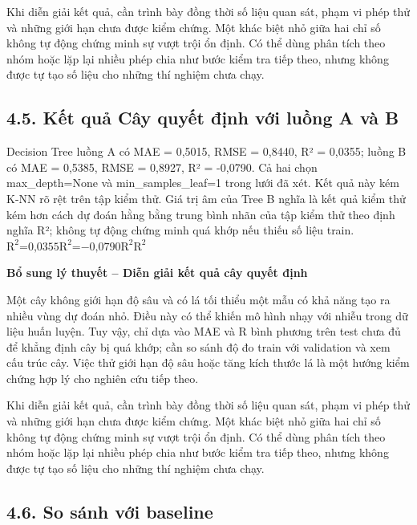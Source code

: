 \documentclass[12pt,a4paper,oneside]{article}
\begin{document}
Khi diễn giải kết quả, cần trình bày đồng thời số liệu quan sát, phạm vi phép thử và những giới hạn chưa được kiểm chứng. Một khác biệt nhỏ giữa hai chỉ số không tự động chứng minh sự vượt trội ổn định. Có thể dùng phân tích theo nhóm hoặc lặp lại nhiều phép chia như bước kiểm tra tiếp theo, nhưng không được tự tạo số liệu cho những thí nghiệm chưa chạy.\par

\subsection*{4.5. Kết quả Cây quyết định với luồng A và B}

Decision Tree luồng A có MAE = 0,5015, RMSE = 0,8440, R² = 0,0355; luồng
B có MAE = 0,5385, RMSE = 0,8927, R² = -0,0790. Cả hai chọn
max\_depth=None và min\_samples\_leaf=1 trong lưới đã xét. Kết quả này
kém K-NN rõ rệt trên tập kiểm thử. Giá trị âm của Tree B nghĩa là kết
quả kiểm thử kém hơn cách dự đoán hằng bằng trung bình nhãn của tập kiểm
thử theo định nghĩa R²; không tự động chứng minh quá khớp nếu thiếu số
liệu
train.\(\text{R}^{\text{2}}\text{=}\text{0}\text{,}\text{0355}\text{R}^{\text{2}}\text{=−}\text{0}\text{,}\text{0790}\text{R}^{\text{2}}\text{R}^{\text{2}}\)


\par\noindent\textbf{Bổ sung lý thuyết -- Diễn giải kết quả cây quyết định}\par
Một cây không giới hạn độ sâu và có lá tối thiểu một mẫu có khả năng tạo ra nhiều vùng dự đoán nhỏ. Điều này có thể khiến mô hình nhạy với nhiễu trong dữ liệu huấn luyện. Tuy vậy, chỉ dựa vào MAE và R bình phương trên test chưa đủ để khẳng định cây bị quá khớp; cần so sánh độ đo train với validation và xem cấu trúc cây. Việc thử giới hạn độ sâu hoặc tăng kích thước lá là một hướng kiểm chứng hợp lý cho nghiên cứu tiếp theo.\par

Khi diễn giải kết quả, cần trình bày đồng thời số liệu quan sát, phạm vi phép thử và những giới hạn chưa được kiểm chứng. Một khác biệt nhỏ giữa hai chỉ số không tự động chứng minh sự vượt trội ổn định. Có thể dùng phân tích theo nhóm hoặc lặp lại nhiều phép chia như bước kiểm tra tiếp theo, nhưng không được tự tạo số liệu cho những thí nghiệm chưa chạy.\par

\subsection*{4.6. So sánh với baseline}
\end{document}
